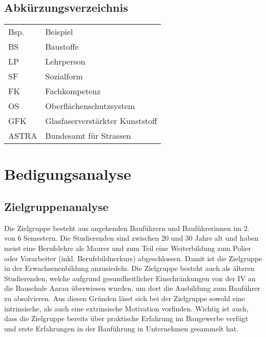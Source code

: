 \documentclass[
11pt,
captions=tableheading,
smallheadings,
headsepline,
footsepline, 
captions=tableheading,
parskip=half-,
]{scrartcl}
\begin{document}
\subsection*{Abkürzungsverzeichnis}
\begin{table}[H]
    \centering
    \label{tab:abkuerzungen}
    \begin{tabularx}{\textwidth}{@{}ll@{}}
        \toprule
        Bsp.  & Beispiel                        \\
        BS    & Baustoffe                       \\
        LP    & Lehrperson                      \\
        SF    & Sozialform                      \\
        FK    & Fachkompetenz                   \\
        OS    & Oberflächenschutzsystem         \\
        GFK   & Glasfaserverstärkter Kunststoff \\
        ASTRA & Bundesamt für Strassen          \\
        \bottomrule
    \end{tabularx}
\end{table}



\clearpage

\section{Bedigungsanalyse}

\subsection{Zielgruppenanalyse}
Die Zielgruppe besteht aus angehenden Bauführern und Bauführerinnen im 2. von 6 Semestern. Die Studierenden sind zwischen 20 und 30 Jahre alt und haben meist eine Berufslehre als Maurer und zum Teil eine Weiterbildung zum Polier oder Vorarbeiter (inkl. Berufsbildnerkurs) abgeschlossen. Damit ist die Zielgruppe in der Erwachsenenbildung anzusiedeln.
Die Zielgruppe besteht auch als älteren Studierenden, welche aufgrund gesundheitlicher Einschränkungen von der IV an die Bauschule Aarau überwiesen wurden, um dort die Ausbildung zum Bauführer zu absolvieren.
Aus diesen Gründen lässt sich bei der Zielgruppe sowohl eine intrinsische, als auch eine extrinsische Motivation vorfinden.
Wichtig ist auch, dass die Zielgruppe bereits über praktische Erfahrung im Baugewerbe verfügt und erste Erfahrungen in der Bauführung in Unternehmen gesammelt hat.
\end{document}
